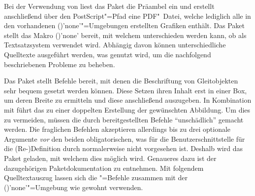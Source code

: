 %
Bei der Verwendung von  liest das Paket  
die Präambel ein und erstellt anschließend über den PostScript"=Pfad 
 eine PDF"~Datei, welche lediglich alle in den 
vorhandenen ()'none'"=Umgebungen 
erstellten Grafiken enthält. Das Paket  stellt das Makro 
()'none' bereit, mit welchem unterschieden werden 
kann, ob  als Textsatzsystem verwendet wird. Abhängig davon 
können unterschiedliche Quelltexte ausgeführt werden, was genutzt wird, um die 
nachfolgend beschriebenen Probleme zu beheben.
%
\begin{quoting}
\begin{Code}
\usepackage{ifpdf}
\end{Code}
\end{quoting}



Das Paket  stellt Befehle bereit, mit denen die Beschriftung 
von Gleitobjekten sehr bequem gesetzt werden können. Diese Setzen ihren Inhalt 
erst in einer Box, um deren Breite zu ermitteln und diese anschließend 
auszugeben. In Kombination mit  führt das zu einer 
doppelten Erstellung der gewünschten Abbildung. Um dies zu vermeiden, müssen 
die durch  bereitgestellten Befehle \enquote{unschädlich} 
gemacht werden. Die fraglichen Befehlen akzeptieren allerdings bis zu drei 
optionale Argumente \emph{vor} den beiden obligatorischen, was für die 
Benutzerschnittstelle für die (Re-)Definition durch  
normalerweise nicht vorgesehen ist. Deshalb wird das Paket  
geladen, mit welchem dies möglich wird. Genaueres dazu ist der dazugehörigen 
Paketdokumentation zu entnehmen. Mit folgendem Quelltextauszug lassen sich die 
"=Befehle zusammen mit der 
()'none'"=Umgebung wie gewohnt 
verwenden.
%
\begin{quoting}
\begin{Code}
\usepackage{floatrow}
\usepackage{xparse}
\ifpdf\else
\fi
\end{Code}
\end{quoting}



